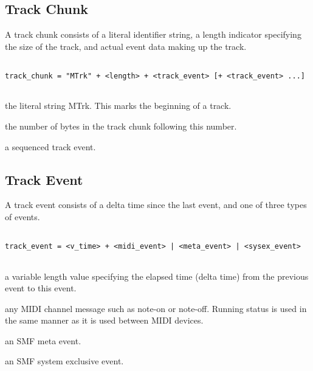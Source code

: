 \protect\hypertarget{track_chunk}{}{}

\hypertarget{track-chunk}{%
\subsection*{Track Chunk}\label{track-chunk}}

A track chunk consists of a literal identifier string, a length
indicator specifying the size of the track, and actual event data making
up the track.

\begin{verbatim}
 
track_chunk = "MTrk" + <length> + <track_event> [+ <track_event> ...]
 
\end{verbatim}

\begin{description}
\tightlist
\item[\textbf{\texttt{"MTrk"}} 4 bytes]
the literal string MTrk. This marks the beginning of a track.
\item[\textbf{\texttt{\textless{}length\textgreater{}}} 4 bytes]
the number of bytes in the track chunk following this number.
\item[\textbf{\texttt{\textless{}track\_event\textgreater{}}}]
a sequenced track event.
\end{description}

\protect\hypertarget{track_event}{}{}

\hypertarget{track-event}{%
\subsection*{Track Event}\label{track-event}}

A track event consists of a delta time since the last event, and one of
three types of events.

\begin{verbatim}
 
track_event = <v_time> + <midi_event> | <meta_event> | <sysex_event>
 
\end{verbatim}

\begin{description}
\tightlist
\item[\textbf{\texttt{\textless{}v\_time\textgreater{}}}]
a variable length value specifying the elapsed time (delta time) from
the previous event to this event.
\item[\textbf{\texttt{\textless{}midi\_event\textgreater{}}}]
any MIDI channel message such as note-on or note-off. Running status is
used in the same manner as it is used between MIDI devices.
\item[\textbf{\texttt{\textless{}meta\_event\textgreater{}}}]
an SMF meta event.
\item[\textbf{\texttt{\textless{}sysex\_event\textgreater{}}}]
an SMF system exclusive event.
\end{description}

